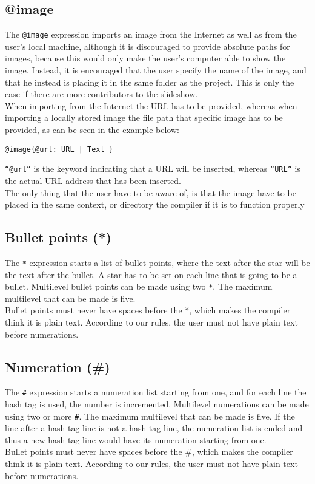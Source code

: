 \subsection{@image}
The \texttt{@image} expression imports an image from the Internet as well as from the user's local machine, although it is discouraged to provide absolute paths for images, because this would only make the user's computer able to show the image. Instead, it is encouraged that the user specify the name of the image, and that he instead is placing it in the same folder as the project. This is only the case if there are more contributors to the slideshow.\\
When importing from the Internet the URL has to be provided, whereas when importing a locally stored image the file path that specific image has to be provided, as can be seen in the example below:
\begin{lstlisting}[frame=single]
@image{@url: URL | Text }
\end{lstlisting}
\texttt{``@url''} is the keyword indicating that a URL will be inserted, whereas \texttt{``URL''} is the actual URL address that has been inserted. \\
The only thing that the user have to be aware of, is that the image have to be placed in the same context, or directory the compiler if it is to function properly

\subsection{Bullet points (*)}
The \texttt{*} expression starts a list of bullet points, where the text after the star will be the text after the bullet.
A star has to be set on each line that is going to be a bullet. Multilevel bullet points can be made using two \texttt{*}. The maximum multilevel that can be made is five. \\
Bullet points must never have spaces before the *, which makes the compiler think it is plain text. According to our rules, the user must not have plain text before numerations.

\subsection{Numeration (\#)}
The \texttt{\#} expression starts a numeration list starting from one, and for each line the hash tag is used, the number is incremented. Multilevel numerations can be made using two or more \texttt{\#}. The maximum multilevel that can be made is five. If the line after a hash tag line is not a hash tag line, the numeration list is ended and thus a new hash tag line would have its numeration starting from one. \\
Bullet points must never have spaces before the \#, which makes the compiler think it is plain text. According to our rules, the user must not have plain text before numerations.

